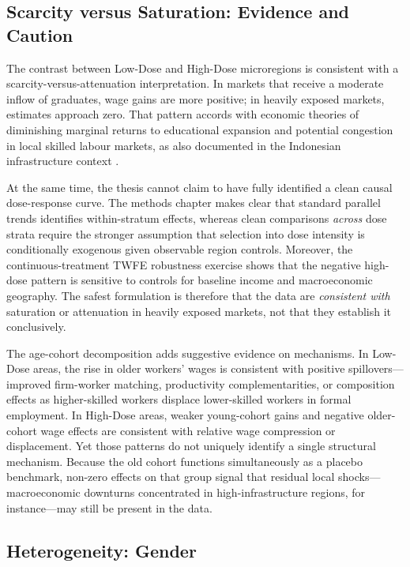 \subsection{Scarcity versus Saturation: Evidence and Caution}

The contrast between Low-Dose and High-Dose microregions is consistent with a scarcity-versus-attenuation interpretation. In markets that receive a moderate inflow of graduates, wage gains are more positive; in heavily exposed markets, estimates approach zero. That pattern accords with economic theories of diminishing marginal returns to educational expansion \cite{CardLemieux2001} and potential congestion in local skilled labour markets, as also documented in the Indonesian infrastructure context \cite{Duflo2001}.

At the same time, the thesis cannot claim to have fully identified a clean causal dose-response curve. The methods chapter makes clear that standard parallel trends identifies within-stratum effects, whereas clean comparisons \emph{across} dose strata require the stronger assumption that selection into dose intensity is conditionally exogenous given observable region controls. Moreover, the continuous-treatment TWFE robustness exercise shows that the negative high-dose pattern is sensitive to controls for baseline income and macroeconomic geography. The safest formulation is therefore that the data are \emph{consistent with} saturation or attenuation in heavily exposed markets, not that they establish it conclusively.

The age-cohort decomposition adds suggestive evidence on mechanisms. In Low-Dose areas, the rise in older workers' wages is consistent with positive spillovers---improved firm-worker matching, productivity complementarities, or composition effects as higher-skilled workers displace lower-skilled workers in formal employment. In High-Dose areas, weaker young-cohort gains and negative older-cohort wage effects are consistent with relative wage compression or displacement. Yet those patterns do not uniquely identify a single structural mechanism. Because the old cohort functions simultaneously as a placebo benchmark, non-zero effects on that group signal that residual local shocks---macroeconomic downturns concentrated in high-infrastructure regions, for instance---may still be present in the data.

\subsection{Heterogeneity: Gender}
\label{sec:gender_discussion}

